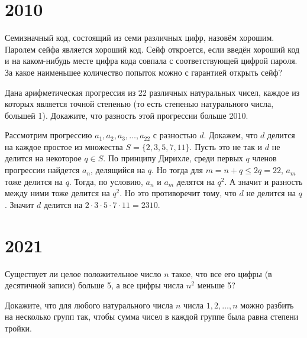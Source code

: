 \documentclass[11pt, a4paper]{problems_template}
\begin{document}
\chapter{2010}

\begin{exercise}[2162]
Семизначный код, состоящий из семи различных цифр, назовём хорошим. Паролем сейфа является хороший код. Сейф откроется, если введён хороший код и на каком-нибудь месте цифра кода совпала с соответствующей цифрой пароля. За какое наименьшее количество попыток можно с гарантией открыть сейф?
\end{exercise}

\begin{exercise}[2202]
Дана арифметическая прогрессия из 22 различных натуральных чисел, каждое из которых является точной степенью (то есть степенью натурального числа, большей 1). Докажите, что разность этой прогрессии больше 2010.
\end{exercise}

\begin{Solution}
Рассмотрим прогрессию $a_{1}, a_{2}, a_{3}, \dots, a_{22}$ с разностью $d$. Докажем, что $d$ делится на каждое простое из множества $S = \{2, 3, 5, 7, 11\}$. Пусть это не так и $d$ не делится на некоторое $q \in S$. По принципу Дирихле, среди первых $q$ членов прогрессии найдется $a_{n}$, делящийся на $q$. Но тогда для $m = n + q \leqslant 2q = 22$,  $a_{m}$ тоже делится на $q$. Тогда, по условию, $a_{n}$ и $a_{m}$ делятся на $q^{2}$. А значит и разность между ними тоже делится на $q^{2}$. Но это противоречит тому, что $d$ не делится на $q$. Значит $d$ делится на $2 \cdot 3 \cdot 5 \cdot 7 \cdot 11 = 2310$.
\end{Solution}

\chapter{2021}

\begin{exercise}[2638]
Существует ли целое положительное число $n$ такое, что все его цифры (в десятичной записи) больше 5, а все цифры числа $n^{2}$ меньше 5?
\end{exercise}

\begin{exercise}[2669]
Докажите, что для любого натурального числа $n$ числа $1, 2, \dots, n$ можно разбить на несколько групп так, чтобы сумма чисел в каждой группе была равна степени тройки.
\end{exercise}
\end{document}
